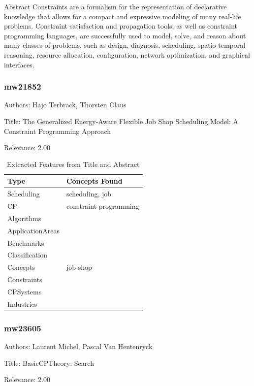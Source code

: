  Abstract 
           Constraints are a formalism for the representation of declarative knowledge that allows for a compact and expressive modeling of many real‐life problems. Constraint satisfaction and propagation tools, as well as constraint programming languages, are successfully used to model, solve, and reason about many classes of problems, such as design, diagnosis, scheduling, spatio‐temporal reasoning, resource allocation, configuration, network optimization, and graphical interfaces. 

\subsubsection{mw21852}
\label{mw:mw21852}

Authors: Hajo Terbrack, Thorsten Claus

Title: The Generalized Energy-Aware Flexible Job Shop Scheduling Model: A Constraint Programming Approach

Relevance:  2.00

{\scriptsize
\begin{longtable}{p{2cm}p{20cm}}
\caption{Extracted Features from Title and Abstract}\\ \toprule
Type & Concepts Found\\ \midrule
\endhead
\bottomrule
\endfoot
Scheduling & scheduling, job\\ 
CP & constraint programming\\ 
Algorithms & \\ 
ApplicationAreas & \\ 
Benchmarks & \\ 
Classification & \\ 
Concepts & job-shop\\ 
Constraints & \\ 
CPSystems & \\ 
Industries & \\ 
\end{longtable}
}



\subsubsection{mw23605}
\label{mw:mw23605}

Authors: Laurent Michel, Pascal Van Hentenryck

Title: BasicCPTheory: Search

Relevance:  2.00

